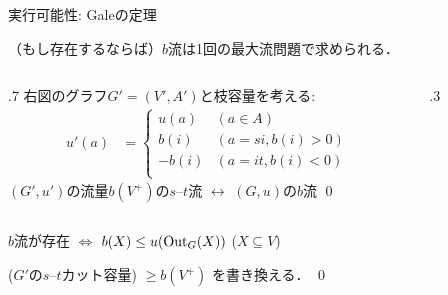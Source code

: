 \documentclass[14pt,aspectratio=169,xcolor=dvipsnames,table,onlytextwidth,dvipdfmx]{beamer}
\begin{document}
\begin{frame}{実行可能性: Galeの定理}
    \small
    \begin{theorem}
        （もし存在するならば）$b$流は1回の最大流問題で求められる．
    \end{theorem}
    \begin{columns}
    \begin{column}{.7\textwidth}
    右図のグラフ$G' = (V', A')$と枝容量を考える:
    \begin{align*}
        u'(a) &= 
        \begin{cases}
            u(a)  & (a \in A) \\
            b(i)  & (a=si, b(i) > 0) \\
            -b(i) & (a=it, b(i) < 0) \\
        \end{cases}
    \end{align*}
    $(G', u')$の流量$b(V^+)$の$s$--$t$流 $\longleftrightarrow$ $(G, u)$の$b$流 \qed
    \end{column}
    \begin{column}{.3\textwidth}
    
    \end{column}
    \end{columns}

    \pause\bigskip
    \begin{corollary}[Gale, 1957]
        $b$流が存在 $\iff$ $b(X) \leq u(\operatorname{Out}_G(X))$ \quad ($X \subseteq V$)
    \end{corollary}
     ($G'$の$s$--$t$カット容量) $\geq b(V^+)$ を書き換える． \qed
\end{frame}
\end{document}
